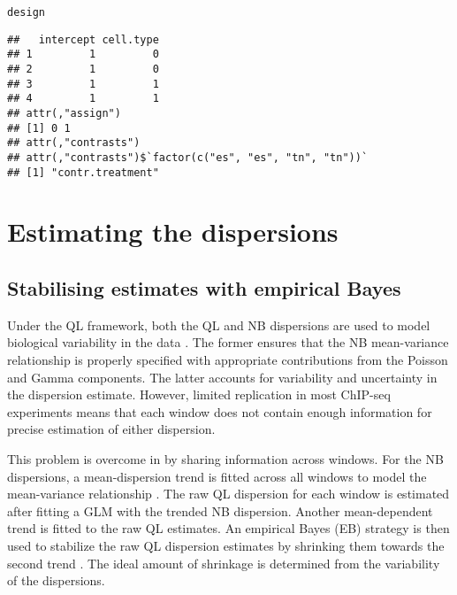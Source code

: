 \documentclass{report}\usepackage[]{graphicx}\usepackage[usenames,dvipsnames]{color}
\newcommand{\hlstd}[1]{\textcolor[rgb]{0.251,0.251,0.251}{#1}}%
\newenvironment{knitrout}{}{} %
\begin{document}
\begin{knitrout}
\color{fgcolor}\begin{kframe}
\begin{alltt}
\hlstd{design}
\end{alltt}
\begin{verbatim}
##   intercept cell.type
## 1         1         0
## 2         1         0
## 3         1         1
## 4         1         1
## attr(,"assign")
## [1] 0 1
## attr(,"contrasts")
## attr(,"contrasts")$`factor(c("es", "es", "tn", "tn"))`
## [1] "contr.treatment"
\end{verbatim}
\end{kframe}
\end{knitrout}

\section{Estimating the dispersions}

\subsection{Stabilising estimates with empirical Bayes}
\label{sec:dispest}
Under the QL framework, both the QL and NB dispersions are used to model biological variability in the data \cite{lund2012}. 
The former ensures that the NB mean-variance relationship is properly specified with appropriate contributions from the Poisson and Gamma components. 
The latter accounts for variability and uncertainty in the dispersion estimate. 
However, limited replication in most ChIP-seq experiments means that each window does not contain enough information for precise estimation of either dispersion. 


This problem is overcome in  by sharing information across windows. 
For the NB dispersions, a mean-dispersion trend is fitted across all windows to model the mean-variance relationship \cite{mccarthy2012}. 
The raw QL dispersion for each window is estimated after fitting a GLM with the trended NB dispersion. 
Another mean-dependent trend is fitted to the raw QL estimates.  
An empirical Bayes (EB) strategy is then used to stabilize the raw QL dispersion estimates by shrinking them towards the second trend \cite{lund2012}. 
The ideal amount of shrinkage is determined from the variability of the dispersions.
\end{document}
